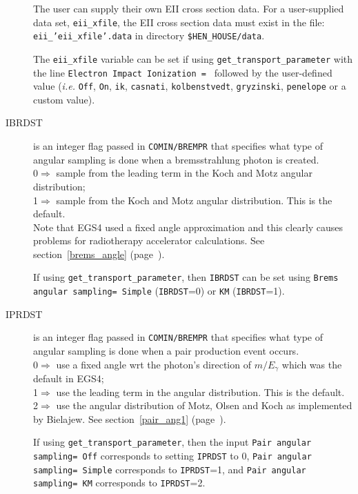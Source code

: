 \begin{description}
The user can supply their own EII cross section data.  For a user-supplied data
set, {\tt eii\_xfile}, the EII cross section data must exist in the file:
{\tt eii\_'eii\_xfile'.data}
in directory {\tt \$HEN\_HOUSE/data}.

The {\tt eii\_xfile} variable can be set if using
{\tt get\_transport\_parameter} with the line
{\tt Electron Impact Ionization = }
followed by the user-defined value
({\em i.e.} {\tt Off}, {\tt On}, {\tt ik}, {\tt casnati},
{\tt kolbenstvedt}, {\tt gryzinski}, {\tt penelope}
or a custom value).

\item[IBRDST] is an integer flag passed in {\tt COMIN/BREMPR} that specifies
what type of angular sampling is done when a bremsstrahlung photon is
created. \\
0$\Rightarrow$ sample from the leading term in the Koch and Motz angular
distribution;\\
1$\Rightarrow$ sample from the Koch and Motz angular
distribution\cite{Bi89}. This is the default.\\
Note that EGS4 used a fixed angle approximation and this clearly
causes problems for radiotherapy accelerator calculations\cite{Fa91}. See
section~\ref{brems_angle} (page~\pageref{brems_angle}).

If using {\tt get\_transport\_parameter}, then {\tt IBRDST} can
be set using {\tt Brems angular sampling= Simple} ({\tt IBRDST}=0)
or {\tt KM} ({\tt IBRDST}=1).

\item[IPRDST] is an integer flag  passed in {\tt COMIN/BREMPR} that specifies
what type of angular sampling is done when a pair production event occurs.\\
0$\Rightarrow$ use a fixed angle wrt the photon's direction of $m/E_\gamma$
which was the default in  EGS4;\\
1$\Rightarrow$ use the leading term in the angular distribution\cite{Bi91}.
This is the default.\\
2$\Rightarrow$ use the angular distribution of Motz, Olsen and
Koch\cite{Mo69} as implemented by Bielajew\cite{Bi91}. See
section~\ref{pair_ang1} (page~\pageref{pair_ang1}).

If using {\tt get\_transport\_parameter}, then the input
{\tt Pair angular sampling= Off} corresponds to setting {\tt IPRDST} to 0,
{\tt Pair angular sampling= Simple} corresponds to {\tt IPRDST}=1, and
{\tt Pair angular sampling= KM} corresponds to {\tt IPRDST}=2.


\end{description}
